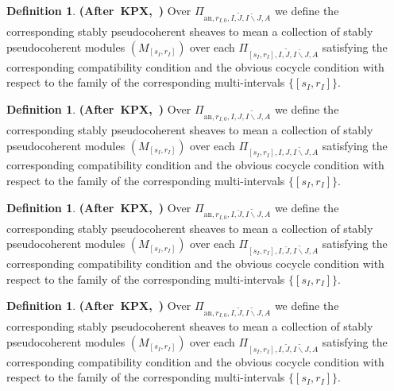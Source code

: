 \documentclass[12pt]{amsart}
\theoremstyle{definition}
\newtheorem{definition}[theorem]{Definition}
\numberwithin{equation}{section}
\begin{document}
\begin{definition} \mbox{\bf{(After KPX, \cite[Definition 2.1.3]{KPX})}}
Over $\Pi_{\mathrm{an},r_{I,0},I,\widetilde{J},\breve{I\backslash J},A}$ we define the corresponding stably pseudocoherent sheaves to mean a collection of stably pseudocoherent modules $(M_{[s_I,r_I]})$ over each $\Pi_{[s_I,r_I],I,\widetilde{J},\breve{I\backslash J},A}$ satisfying the corresponding compatibility condition and the obvious cocycle condition with respect to the family of the corresponding multi-intervals $\{[s_I,r_I]\}$.
\end{definition}


\begin{definition} \mbox{\bf{(After KPX, \cite[Definition 2.1.3]{KPX})}}
Over $\Pi_{\mathrm{an},r_{I,0},I,{J},\widetilde{I\backslash J},A}$ we define the corresponding stably pseudocoherent sheaves to mean a collection of stably pseudocoherent modules $(M_{[s_I,r_I]})$	over each $\Pi_{[s_I,r_I],I,{J},\widetilde{I\backslash J},A}$ satisfying the corresponding compatibility condition and the obvious cocycle condition with respect to the family of the corresponding multi-intervals $\{[s_I,r_I]\}$.
\end{definition}


\begin{definition} \mbox{\bf{(After KPX, \cite[Definition 2.1.3]{KPX})}}
Over $\Pi_{\mathrm{an},r_{I,0},I,\breve{J},\widetilde{I\backslash J},A}$ we define the corresponding stably pseudocoherent sheaves to mean a collection of stably pseudocoherent modules $(M_{[s_I,r_I]})$ over each $\Pi_{[s_I,r_I],I,\breve{J},\widetilde{I\backslash J},A}$ satisfying the corresponding compatibility condition and the obvious cocycle condition with respect to the family of the corresponding multi-intervals $\{[s_I,r_I]\}$.
\end{definition}


\begin{definition} \mbox{\bf{(After KPX, \cite[Definition 2.1.3]{KPX})}}
Over $\Pi_{\mathrm{an},r_{I,0},I,\widetilde{J},\widetilde{I\backslash J},A}$ we define the corresponding stably pseudocoherent sheaves to mean a collection of stably pseudocoherent modules $(M_{[s_I,r_I]})$ over each $\Pi_{[s_I,r_I],I,\widetilde{J},\widetilde{I\backslash J},A}$ satisfying the corresponding compatibility condition and the obvious cocycle condition with respect to the family of the corresponding multi-intervals $\{[s_I,r_I]\}$.
\end{definition}
\end{document}
